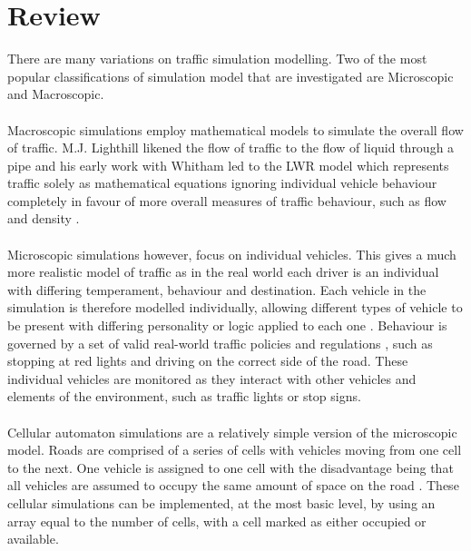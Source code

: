 \section{Review}
There are many variations on traffic simulation modelling. Two of the most popular classifications of simulation model that are investigated are Microscopic and Macroscopic.

\paragraph{}
Macroscopic simulations employ mathematical models to simulate the overall flow of traffic. M.J. Lighthill likened the flow of traffic to the flow of liquid through a pipe and his early work with Whitham led to the LWR model which represents traffic solely as mathematical equations \cite{Lighthill1955Kinetic,Treiber2013Flow,6042479} ignoring individual vehicle behaviour completely in favour of more overall measures of traffic behaviour, such as flow and density \cite{boxill2000evaluation,ehlert2001reactive}. 

\paragraph{}
Microscopic simulations however, focus on individual vehicles. This gives a much more realistic model of traffic as in the real world each driver is an individual with differing temperament, behaviour and destination. Each vehicle in the simulation is therefore modelled individually, allowing different types of vehicle to be present with differing personality or logic applied to each one \cite{Owen:2000:STS:510378.510542}. Behaviour is governed by a set of valid real-world traffic policies and regulations \cite{Schulze:1997:UTS:268437.268764}, such as stopping at red lights and driving on the correct side of the road.
These individual vehicles are monitored as they interact with other vehicles and elements of the environment, such as traffic lights or stop signs.

\paragraph{}
Cellular automaton simulations are a relatively simple version of the microscopic model. Roads are comprised of a series of cells with vehicles moving from one cell to the next. One vehicle is assigned to one cell with the disadvantage being that all vehicles are assumed to occupy the same amount of space on the road \cite{Namekawa2005CellAutomaton,6737859}. These cellular simulations can be implemented, at the most basic level, by using an array equal to the number of cells, with a cell marked as either occupied or available.

